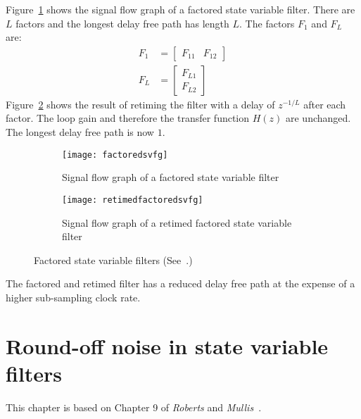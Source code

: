 \documentclass[a4paper,twoside,10pt,english]{report}
\begin{document}
Figure~\ref{subfig:Factored-SVFG} shows the signal flow graph of a factored
state variable filter. There are $L$ factors and the longest delay free path
has length $L$. The factors $F_1$ and $F_L$ are:
\begin{align*}
F_{1} &= 
\left[\begin{array}{cc}
F_{11} & F_{12}
\end{array}\right]\\
F_{L} &= 
\left[\begin{array}{c}
F_{L1} \\
F_{L2}
\end{array}\right]
\end{align*}
Figure~\ref{subfig:Retimed-Factored-SVFG} shows the result of 
retiming the filter with a delay of $z^{-1/L}$ after each factor. The 
loop gain and therefore the transfer function $H\left(z\right)$ are unchanged.
The longest delay free path is now $1$.
\begin{figure}[!htbp]
\begin{center}
\begin{subfigure}{\textwidth}
\begin{center}
\texttt{[image: factoredsvfg]}
\caption{Signal flow graph of a factored state variable filter}
\label{subfig:Factored-SVFG}
\vspace{1cm}
\end{center}
\end{subfigure}
\begin{subfigure}{\textwidth}
\begin{center}
\texttt{[image: retimedfactoredsvfg]}
\caption{Signal flow graph of a retimed factored state variable filter}
\label{subfig:Retimed-Factored-SVFG}
\end{center}
\end{subfigure}
\caption{Factored state variable filters (See~\cite[Figure 8.4.6]{RobertsMullis_DigitalSignalProcessing}.)}
\label{fig:Factored-state-variable-filters}
\end{center}
\end{figure}

The factored and retimed filter has a reduced delay free path at the
expense of a higher sub-sampling clock rate.

\cleardoublepage{}
\chapter{Round-off noise in state variable filters\label{sec:Round-off-noise-in-state-variable-filters}}
This chapter is based on Chapter 9 of \emph{Roberts} and
\emph{Mullis}~\cite{RobertsMullis_DigitalSignalProcessing}. 
\end{document}

